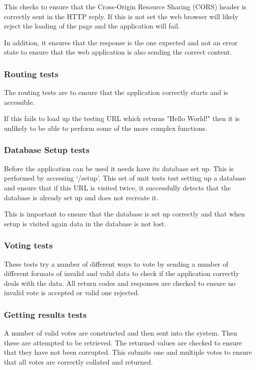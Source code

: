 This checks to ensure that the Cross-Origin Resource Sharing (CORS) header is correctly sent in the HTTP reply. If this is not set the web browser will likely reject the loading of the page and the application will fail.

In addition, it ensures that the response is the one expected and not an error state to ensure that the web application is also sending the correct content.

\subsubsection{Routing tests}

The routing tests are to ensure that the application correctly starts and is accessible.

If this fails to load up the testing URL which returns "Hello World!" then it is unlikely to be able to perform some of the more complex functions.

\subsubsection{Database Setup tests}

Before the application can be used it needs have its database set up. This is performed by accessing `/setup'. This set of unit tests test setting up a database and ensure that if this URL is visited twice, it successfully detects that the database is already set up and does not recreate it. 

This is important to ensure that the database is set up correctly and that when setup is visited again data in the database is not lost.

\subsubsection{Voting tests}

These tests try a number of different ways to vote by sending a number of different formats of invalid and valid data to check if the application correctly deals with the data. All return codes and responses are checked to ensure no invalid vote is accepted or valid one rejected.

\subsubsection{Getting results tests}

A number of valid votes are constructed and then sent into the system. Then these are attempted to be retrieved. The returned values are checked to ensure that they have not been corrupted. This submits one and multiple votes to ensure that all votes are correctly collated and returned.

